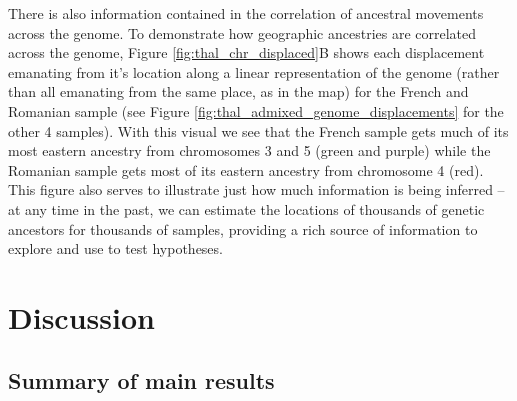 \documentclass[12pt]{article}
\begin{document}
There is also information contained in the correlation of ancestral movements across the genome. 
To demonstrate how geographic ancestries are correlated across the genome, Figure \ref{fig:thal_chr_displaced}B shows each displacement emanating from it's location along a linear representation of the genome (rather than all emanating from the same place, as in the map) for the French and Romanian sample (see Figure \ref{fig:thal_admixed_genome_displacements} for the other 4 samples).
With this visual we see that the French sample gets much of its most eastern ancestry from chromosomes 3 and 5 (green and purple) while the Romanian sample gets most of its eastern ancestry from chromosome 4 (red).
This figure also serves to illustrate just how much information is being inferred -- at any time in the past, we can estimate the locations of thousands of genetic ancestors for thousands of samples, providing a rich source of information to explore and use to test hypotheses.

\clearpage\newpage %
\section*{Discussion}

\subsection*{Summary of main results}
\end{document}
